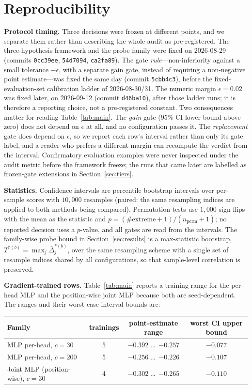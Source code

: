 \documentclass[10pt]{article}
\begin{document}
\section{Reproducibility}
\label{app:repro}
\textbf{Protocol timing.} Three decisions were frozen at different points, and
we separate them rather than describing the whole audit as pre-registered. The
three-hypothesis framework and the probe family were fixed on 2026-08-29
(commits \texttt{0cc39ee}, \texttt{54d7094}, \texttt{ca2fa89}). The gate
\emph{rule}---non-inferiority against a small tolerance $-\epsilon$, with a
separate gain gate, instead of requiring a non-negative point estimate---was
fixed the same day (commit \texttt{5cbb4c3}), before the fixed-evaluation-set
calibration ladder of 2026-08-30/31. The numeric margin $\epsilon{=}0.02$ was
fixed later, on 2026-09-12 (commit \texttt{d46ba10}), after those ladder runs;
it is therefore a reporting choice, not a pre-registered constant. Two
consequences matter for reading Table~\ref{tab:main}. The \emph{gain} gate
($95\%$ CI lower bound above zero) does not depend on $\epsilon$ at all, and no
configuration passes it. The \emph{replacement} gate does depend on $\epsilon$,
so we report each row's interval rather than only its gate label, and a reader
who prefers a different margin can recompute the verdict from the interval.
Confirmatory evaluation examples were never inspected under the audit metric
before the framework freeze; the runs that came later are labelled as
frozen-gate extensions in Section~\ref{sec:tiers}.

\textbf{Statistics.} Confidence intervals are percentile bootstrap intervals
over per-sample scores with $10{,}000$ resamples (paired: the same resampling
indices are applied to both methods being compared). Permutation tests use
$1{,}000$ sign flips with the mean as the statistic and
$p=(\#\text{extreme}+1)/(n_{\text{perm}}+1)$; no reported decision uses a
$p$-value, and all gates are read from the intervals. The family-wise probe
bound in Section~\ref{sec:results} is a max-statistic bootstrap, $T^{*(b)}=\max_j \bar\Delta_j^{*(b)}$, over the same resampling scheme with a
single set of resample indices shared by all configurations, so that sample-level correlation is preserved.

\textbf{Gradient-trained rows.} Table~\ref{tab:main} reports a training range
for the per-head MLP and the position-wise joint MLP because both are
seed-dependent. The ranges and their worst-case interval bounds are:

\begin{center}
\footnotesize
\begin{tabular}{lccc}
\toprule
Family & trainings & point-estimate range & worst CI upper bound \\
\midrule
MLP per-head, $c{=}30$ & 5 & $-0.392$ \dots\ $-0.257$ & $-0.077$ \\
MLP per-head, $c{=}200$ & 5 & $-0.256$ \dots\ $-0.226$ & $-0.107$ \\
Joint MLP (position-wise), $c{=}30$ & 4 & $-0.302$ \dots\ $-0.265$ & $-0.110$ \\
\bottomrule
\end{tabular}
\end{center}
\end{document}
